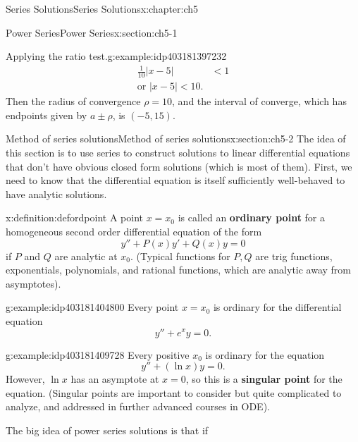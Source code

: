 \documentclass[oneside,10pt,]{book}
\newcommand{\terminology}[1]{\textbf{#1}}
\numberwithin{equation}{section}
\newcommand{\abs}[1]{\left\vert#1\right\vert}
\numberwithin{equation}{section}
\newcommand{\lt}{<}
\newcommand{\amp}{&}
\begin{document}
\begin{chapterptx}{Series Solutions}{}{Series Solutions}{}{}{x:chapter:ch5}
\begin{sectionptx}{Power Series}{}{Power Series}{}{}{x:section:ch5-1}
\begin{example}{Applying the ratio test.}{g:example:idp403181397232}
\begin{align*}
\frac{1}{10}\abs{x-5} \amp \lt 1\\
\text{or } \abs{x-5} \lt 10.
\end{align*}
Then the radius of convergence \(\rho = 10\), and the interval of converge, which has endpoints given by \(a \pm \rho\), is \((-5,15)\).%
\end{example}
\end{sectionptx}
%
%
\typeout{************************************************}
\typeout{************************************************}
%
\begin{sectionptx}{Method of series solutions}{}{Method of series solutions}{}{}{x:section:ch5-2}
The idea of this section is to use series to construct solutions to linear differential equations that don't have obvious closed form solutions (which is most of them). First, we need to know that the differential equation is itself sufficiently well-behaved to have analytic solutions.%
\begin{definition}{}{x:definition:defordpoint}%
A point \(x=x_0\) is called an \terminology{ordinary point} for a homogeneous second order differential equation of the form%
\begin{equation*}
y'' + P(x)y' + Q(x)y = 0
\end{equation*}
if \(P\) and \(Q\) are analytic at \(x_0\). (Typical functions for \(P,Q\) are trig functions, exponentials, polynomials, and rational functions, which are analytic away from asymptotes).%
\end{definition}
\begin{example}{}{g:example:idp403181404800}%
Every point \(x=x_0\) is ordinary for the differential equation%
\begin{equation*}
y'' + e^x y = 0.
\end{equation*}
%
\end{example}
\begin{example}{}{g:example:idp403181409728}%
Every positive \(x_0\) is ordinary for the equation%
\begin{equation*}
y'' + (\ln x) y = 0.
\end{equation*}
However, \(\ln x\) has an asymptote at \(x=0\), so this is a \terminology{singular point} for the equation. (Singular points are important to consider but quite complicated to analyze, and addressed in further advanced courses in ODE).%
\end{example}
The big idea of power series solutions is that if%

\end{sectionptx}
\end{chapterptx}
\end{document}
